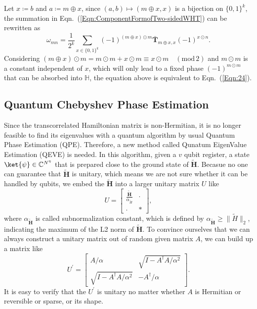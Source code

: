 Let $x\coloneqq b$ and $a\coloneqq m\oplus x$, since $(a,b)\mapsto (m\oplus x,x) $ is a bijection on $\{0,1\}^k$, the summation in Eqn.~(\ref{Eqn:ComponentFormofTwo-sidedWHT}) can be rewritten as
\begin{equation}
    \omega_{mn}=\frac{1}{2^k}\sum_{x\in\{0,1\}^k}(-1)^{(m\oplus x)\odot m}\bar{\textbf{T}}_{m\oplus x,x}(-1)^{x\odot n}.
\end{equation}
Considering $(m\oplus x)\odot m=m\odot m+x\odot m\equiv x\odot m\quad(\text{mod}\,2)$ and $m\odot m$ is a constant independent of $x$, which will only lead to a fixed phase $(-1)^{m\odot m}$ that can be absorbed into $\mathbb{H}$, the equation above is equivalent to Eqn.~(\ref{Eqn:24}).

\subsection{Quantum Chebyshev Phase Estimation}
Since the transcorrelated Hamiltonian matrix is non-Hermitian, it is no longer feasible to find its eigenvalues with a quantum algorithm by usual Quantum Phase Estimation (QPE). Therefore, a new method called Qunatum EigenValue Estimation (QEVE) \cite{inproceedings} is needed. In this algorithm, given a $v$ qubit register, a state $\ket{\psi}\in \mathbb{C}^{N^\eta}$ that is prepared close to the ground state of $\tilde{\textbf{H}}$. Becasue no one can guarantee that $\tilde{\textbf{H}}$ is unitary, which means we are not sure whether it can be handled by qubits, we embed the $\tilde{\textbf{H}}$ into a larger unitary matrix $U$ like
\begin{equation}
    U=
    \begin{bmatrix}
        \frac{\tilde{\textbf{H}}}{\alpha_{\tilde{H}}} & \cdot \\
        \cdot & *
    \end{bmatrix},
    \label{eqn:blockEncoding}
\end{equation}
where $\alpha_{\tilde{\textbf{H}}}$ is called subnormalization constant, which is defined by $\alpha_{\tilde{\mathbf{H}}} \geq \| \tilde{H} \|_2$, indicating the maximum of the L2 norm of $\tilde{\textbf{H}}$. To convince ourselves that we can always construct a unitary matrix out of random given matrix $A$, we can build up a matrix like
\begin{equation}
    U^{\prime}=
    \begin{bmatrix}
        A/\alpha & \sqrt{I-A^{\dagger}A/\alpha^2} \\
        \sqrt{I-A^{\dagger}A/\alpha^2} & -A^{\dagger}/\alpha
    \end{bmatrix}.
\end{equation}
It is easy to verify that the $U^{\prime}$ is unitary no matter whether $A$ is Hermitian or reversible or sparse, or its shape.

